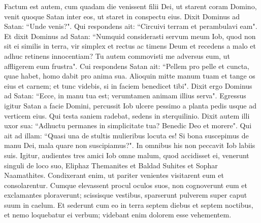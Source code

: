 \begin{biblechapter}  
\verse Factum est autem, cum quadam die venissent filii Dei, ut starent coram Domino, venit quoque Satan inter eos, ut staret in conspectu eius. 
\verse Dixit Dominus ad Satan: “Unde venis?". Qui respondens ait: “Circuivi terram et perambulavi eam". 
\verse Et dixit Dominus ad Satan: “Numquid considerasti servum meum Iob, quod non sit ei similis in terra, vir simplex et rectus ac timens Deum et recedens a malo et adhuc retinens innocentiam? Tu autem commovisti me adversus eum, ut affligerem eum frustra". 
\verse Cui respondens Satan ait: “Pellem pro pelle et cuncta, quae habet, homo dabit pro anima sua. 
\verse Alioquin mitte manum tuam et tange os eius et carnem; et tunc videbis, si in faciem benedicet tibi". 
\verse Dixit ergo Dominus ad Satan: “Ecce, in manu tua est; verumtamen animam illius serva". 
\verse Egressus igitur Satan a facie Domini, percussit Iob ulcere pessimo a planta pedis usque ad verticem eius. 
\verse Qui testa saniem radebat, sedens in sterquilinio. 
\verse Dixit autem illi uxor sua: “Adhuctu permanes in simplicitate tua? Benedic Deo et morere". 
\verse Qui ait ad illam: “Quasi una de stultis mulieribus locuta es! Si bona suscepimus de manu Dei, mala quare non suscipiamus?". In omnibus his non peccavit Iob labiis suis. 
\verse Igitur, audientes tres amici Iob omne malum, quod accidisset ei, venerunt singuli de loco suo, Eliphaz Themanites et Baldad Suhites et Sophar Naamathites. Condixerant enim, ut pariter venientes visitarent eum et consolarentur. 
\verse Cumque elevassent procul oculos suos, non cognoverunt eum et exclamantes ploraverunt; scissisque vestibus, sparserunt pulverem super caput suum in caelum. 
\verse Et sederunt cum eo in terra septem diebus et septem noctibus, et nemo loquebatur ei verbum; videbant enim dolorem esse vehementem. 
\end{biblechapter}

